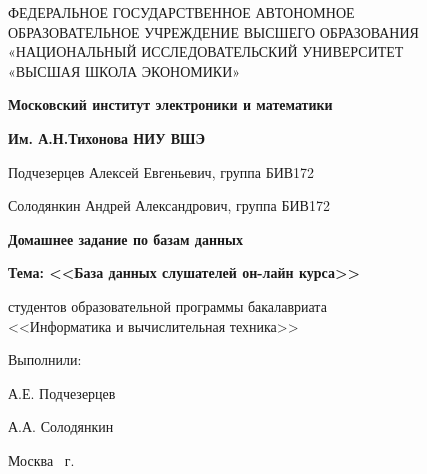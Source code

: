 \begin{titlepage}
	\begin{center}
		ФЕДЕРАЛЬНОЕ  ГОСУДАРСТВЕННОЕ АВТОНОМНОЕ \\
		ОБРАЗОВАТЕЛЬНОЕ УЧРЕЖДЕНИЕ ВЫСШЕГО ОБРАЗОВАНИЯ\\
		«НАЦИОНАЛЬНЫЙ ИССЛЕДОВАТЕЛЬСКИЙ УНИВЕРСИТЕТ\\
		«ВЫСШАЯ ШКОЛА ЭКОНОМИКИ»
	\end{center}
	
	\begin{center}
		\textbf{Московский институт электроники и математики}
		
		\textbf{Им. А.Н.Тихонова НИУ ВШЭ}
	\end{center}
	\vspace{1ex}	
	\begin{center}
		Подчезерцев Алексей Евгеньевич, группа БИВ172
		
		Солодянкин Андрей Александрович, группа БИВ172
	\end{center}	
	\vspace{1ex}
	\begin{center}
		\textbf{Домашнее задание по базам данных}
	\end{center}		
	\begin{center}
		\textbf{Тема: <<База данных слушателей он-лайн курса>>	}
	\end{center}
	\vspace{2ex}
	\begin{center}
		студентов образовательной программы бакалавриата \\
		<<Информатика и вычислительная техника>> \\
		
	\end{center}
	\vspace{2ex}
	\begin{flushright}
		Выполнили: 
		
		\vspace{1ex}
		А.Е. Подчезерцев 
		
		\vspace{1ex}
		А.А. Солодянкин 
	\end{flushright}

	\vfill
	\begin{center}
		Москва \the\year \, г.
	\end{center}
\end{titlepage}